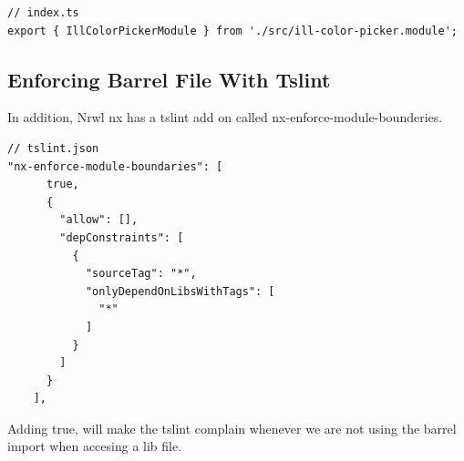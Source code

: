 \begin{lstlisting}
// index.ts
export { IllColorPickerModule } from './src/ill-color-picker.module';
\end{lstlisting}

\subsection{ Enforcing Barrel File With Tslint }
In addition, Nrwl nx has a tslint add on called nx-enforce-module-bounderies.
\begin{lstlisting}
// tslint.json
"nx-enforce-module-boundaries": [
      true,
      {
        "allow": [],
        "depConstraints": [
          {
            "sourceTag": "*",
            "onlyDependOnLibsWithTags": [
              "*"
            ]
          }
        ]
      }
    ],
\end{lstlisting}

Adding true, will make the tslint complain whenever we are not using the barrel
import when accesing a lib file.
